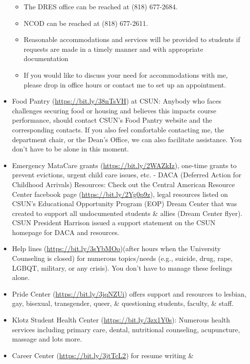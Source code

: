 \documentclass[11pt,]{article}
\providecommand{\tightlist}{%
  \setlength{\itemsep}{0pt}\setlength{\parskip}{0pt}}
\begin{document}
\begin{itemize}
  \begin{itemize}
  \tightlist
  \item
    The DRES office can be reached at (818) 677-2684.
  \item
    NCOD can be reached at (818) 677-2611.
  \item
    Reasonable accommodations and services will be provided to students
    if requests are made in a timely manner and with appropriate
    documentation
  \item
    If you would like to discuss your need for accommodations with me,
    please drop in office hours or contact me to set up an appointment.
  \end{itemize}
\item
  Food Pantry (\url{https://bit.ly/38nTsVH}) at CSUN: Anybody who faces
  challenges securing food or housing and believes this impacts course
  performance, should contact CSUN's Food Pantry website and the
  corresponding contacts. If you also feel comfortable contacting me,
  the department chair, or the Dean's Office, we can also facilitate
  assistance. You don't have to be alone in this moment.
\item
  Emergency MataCare grants (\url{https://bit.ly/2WAZkIz}), one-time
  grants to prevent evictions, urgent child care issues, etc. - DACA
  (Deferred Action for Childhood Arrivals) Resources: Check out the
  Central American Resource Center facebook page
  (\url{https://bit.ly/2Yg0p9z}), legal resources listed on CSUN's
  Educational Opportunity Program (EOP) Dream Center that was created to
  support all undocumented students \& allies (Dream Center flyer). CSUN
  President Harrison issued a support statement on the CSUN homepage for
  DACA and resources.
\item
  Help lines (\url{https://bit.ly/3sYbMOo})(after hours when the
  University Counseling is closed) for numerous topics/needs (e.g.,
  suicide, drug, rape, LGBQT, military, or any crisis). You don't have
  to manage these feelings alone.
\item
  Pride Center (\url{https://bit.ly/3jqNZUi}) offers support and
  resources to lesbian, gay, bisexual, transgender, queer, \&
  questioning students, faculty, \& staff.
\item
  Klotz Student Health Center (\url{https://bit.ly/3zx1Y0s}): Numerous
  health services including primary care, dental, nutritional
  counseling, acupuncture, massage and lots more.
\item
  Career Center (\url{https://bit.ly/3jtTcL2}) for resume writing \&

\end{itemize}
\end{document}
